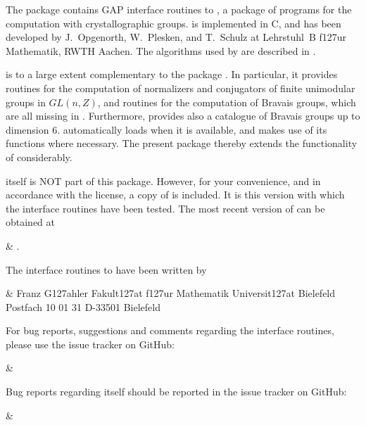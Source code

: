 

The package {\CaratInterface} contains GAP interface routines to {\CARAT}, 
a package of programs for the computation with crystallographic
groups. {\CARAT} is implemented in C, and has been developed by
J.~Opgenorth, W.~Plesken, and T.~Schulz at Lehrstuhl~B f\accent127ur 
Mathematik, RWTH Aachen. The algorithms used by {\CARAT} are described 
in \cite{OPS98}. 

{\CARAT} is to a large extent complementary to the {\GAP} package
{\Cryst}. In particular, it provides routines for the computation 
of normalizers and conjugators of finite unimodular groups in $GL(n,Z)$,
and routines for the computation of Bravais groups, which are all 
missing in {\Cryst}.  Furthermore, {\CARAT} provides also a catalogue of 
Bravais groups up to dimension 6. {\Cryst} automatically loads {\CARAT}
when it is available, and makes use of its functions where necessary. 
The present package thereby extends the functionality of {\Cryst} 
considerably.

{\CARAT} itself is NOT part of this package. However, for your convenience,
and in accordance with the {\CARAT} license, a copy of {\CARAT} is 
included. It is this version with which the interface routines 
have been tested. The most recent version of {\CARAT} can be obtained at 

\beginitems
&
.
\enditems
 
The {\GAP} interface routines to {\CARAT} have been written by

\beginitems
&
Franz G\accent127ahler\hfill\break
Fakult\accent127at f\accent127ur Mathematik\hfill\break
Universit\accent127at Bielefeld\hfill\break
Postfach 10 01 31\hfill\break
D-33501 Bielefeld\hfill\break
{}
\enditems

For bug reports, suggestions and comments regarding the interface routines, 
please use the issue tracker on GitHub:

\beginitems
&
\enditems

Bug reports regarding {\CARAT} itself should be reported in the
{\CARAT} issue tracker on GitHub:

\beginitems
&
\enditems

